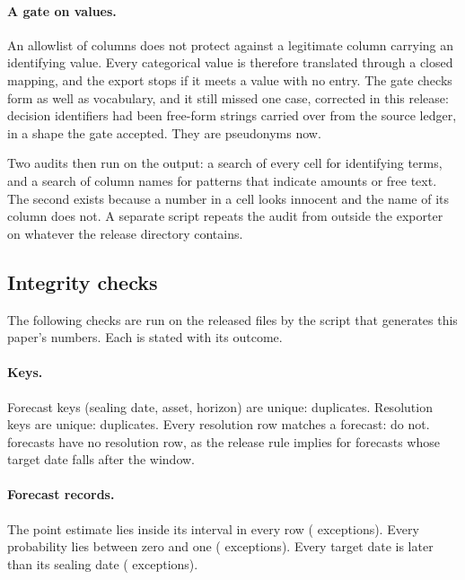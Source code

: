 \documentclass[11pt,a4paper]{article}
\begin{document}
\paragraph{A gate on values.} An allowlist of columns does not protect against
a legitimate column carrying an identifying value. Every categorical value is
therefore translated through a closed mapping, and the export stops if it
meets a value with no entry. The gate checks form as well as vocabulary, and
it still missed one case, corrected in this release: decision identifiers had
been free-form strings carried over from the source ledger, in a shape the
gate accepted. They are pseudonyms now.

Two audits then run on the output: a search of every cell for identifying
terms, and a search of column names for patterns that indicate amounts or
free text. The second exists because a number in a cell looks innocent and
the name of its column does not. A separate script repeats the audit from
outside the exporter on whatever the release directory contains.

\subsection{Integrity checks}\label{app:validation}

The following checks are run on the released files by the script that
generates this paper's numbers. Each is stated with its outcome.

\paragraph{Keys.} Forecast keys (sealing date, asset, horizon) are unique:
\VDupForecastKeys{} duplicates. Resolution keys are unique:
\VDupResolutionKeys{} duplicates. Every resolution row matches a forecast:
\VOrphanResolutions{} do not. \VUnresolvedForecasts{} forecasts have no
resolution row, as the release rule implies for forecasts whose target date
falls after the window.

\paragraph{Forecast records.} The point estimate lies inside its interval in
every row (\VPointOutsideBand{} exceptions). Every probability lies between
zero and one (\VProbOutOfRange{} exceptions). Every target date is later than
its sealing date (\VTargetBeforeAsOf{} exceptions).
\end{document}
